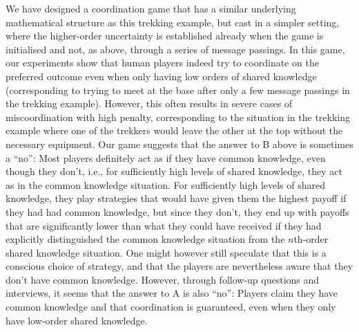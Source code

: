 We have designed a coordination game that has a similar underlying mathematical structure as this trekking example, but cast in a simpler setting, where the higher-order uncertainty is established already when the game is initialised and not, as above, through a series of message passings. In this game, our experiments show that human players indeed try to coordinate on the preferred outcome even when only having low orders of shared knowledge (corresponding to trying to meet at the base after only a  few message passings in the trekking example). However, this often results in severe cases of miscoordination with high penalty, corresponding to the situation in the trekking example where one of the trekkers would leave the other at the top without the necessary equipment. Our game suggests that the answer to B above is sometimes a ``no'': Most players definitely act as if they have common knowledge, even though they don't, i.e., for sufficiently high levels of shared knowledge, they act as in the common knowledge situation. For sufficiently high levels of shared knowledge, they play strategies that would have given them the highest payoff if they had had common knowledge, but since they don't, they end up with payoffs that are significantly lower than what they could have received if they had explicitly distinguished the common knowledge situation from the $n$th-order shared knowledge situation. One might however still speculate that this is a 
conscious choice of strategy, and that the players are nevertheless aware that they don't have common knowledge. However, through follow-up questions and interviews, it seems that the answer to A is also ``no'': Players claim they have common knowledge and that coordination is guaranteed, even when they only have low-order shared knowledge.     

